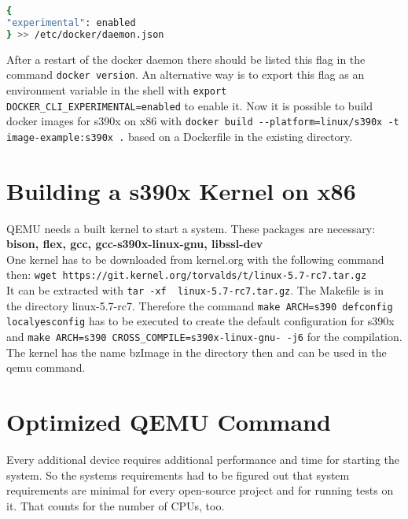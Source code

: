 \begin{lstlisting}[style=BashInputStyle,language=bash,caption={Docker Experimental Flag},captionpos=b]
{
"experimental": enabled
} >> /etc/docker/daemon.json
\end{lstlisting}

After a restart of the docker daemon there should be listed this flag in the command  \lstinline!docker version!. An alternative way is to export this flag as an environment variable in the shell with  \lstinline!export DOCKER_CLI_EXPERIMENTAL=enabled! to enable it. Now it is possible to build docker images for s390x on x86 with  \lstinline!docker build --platform=linux/s390x -t image-example:s390x .! based on a Dockerfile in the existing directory.

 

 

\section{Building a s390x Kernel on x86}

QEMU needs a built kernel to start a system. These packages are necessary: \\
\textbf{bison, flex, gcc, gcc-s390x-linux-gnu, libssl-dev} \\
One kernel has to be downloaded from kernel.org with the following command then:  \lstinline!wget https://git.kernel.org/torvalds/t/linux-5.7-rc7.tar.gz!\\
It can be extracted with \lstinline!tar -xf  linux-5.7-rc7.tar.gz!. The Makefile is in the directory linux-5.7-rc7. Therefore the command \lstinline!make ARCH=s390 defconfig localyesconfig! has to be executed to create the default configuration for s390x and  \lstinline!make ARCH=s390 CROSS_COMPILE=s390x-linux-gnu- -j6! for the compilation. The kernel has the name bzImage in the directory  then and can be used in the qemu command.

\section{Optimized QEMU Command}

Every additional device requires additional performance and time for starting the system. 
So the systems requirements had to be figured out that system requirements are minimal for every open-source project and for running tests on it. 
That counts for the number of CPUs, too. \\


